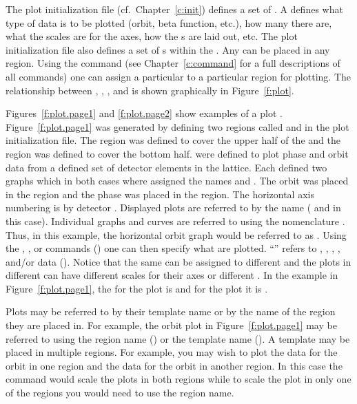The plot initialization file (cf.~Chapter~\ref{c:init}) defines a set of . A  defines what type of data is to be plotted (orbit, beta function,
etc.), how many  there are, what the scales are for the  axes, how
the s are laid out, etc.  The plot initialization file also defines a set of
s within the . Any  can be placed in any
region. Using the  command (see Chapter~\ref{c:command} for a full descriptions
of all commands) one can assign a particular  to a particular region for
plotting.  The relationship between , , , and  is
shown graphically in Figure~\ref{f:plot}.

Figures~\ref{f:plot.page1} and \ref{f:plot.page2} show examples of a plot
. Figure~\ref{f:plot.page1} was generated by defining two regions called 
and  in the plot initialization file. The  region was defined to cover
the upper half of the  and the  region was defined to cover the bottom
half.  were defined to plot phase and orbit data from a defined set of
detector elements in the lattice. Each  defined two graphs which in both
cases where assigned the names  and . The orbit  was placed
in the  region and the phase  was placed in the 
region. The horizontal axis numbering is by detector .  Displayed plots are
referred to by the  name ( and  in this case). Individual
graphs and curves are referred to using the nomenclature . Thus, in
this example, the horizontal orbit graph would be referred to as .  Using the
, , or  commands () one can then
specify what  are plotted. ``'' refers to ,
, , , and/or  data ().
Notice that the same  can be assigned to different  and the
plots in different  can have different scales for their axes or different
. In the example in Figure~\ref{f:plot.page1}, the  for the
 plot is  and for the  plot it is .

Plots may be referred to by their template name or by the name of the region they are
placed in. For example, the orbit plot in Figure~\ref{f:plot.page1} may be referred to
using the region name () or the template name (). A template may be
placed in multiple regions.  For example, you may wish to plot the  data for the
orbit in one region and the  data for the orbit in another region. In this case
the command  would scale the plots in both regions while to scale the plot
in only one of the regions you would need to use the region name.

